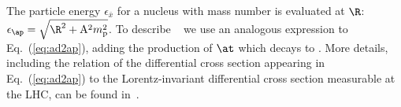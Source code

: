 % 
% 
The particle energy $\epsilon_{\bar x}$ for a nucleus with mass number \Anucl is evaluated at $\R$: $\epsilon_{\ap}=\sqrt{\R^{2}+\mathrm{A}^2m_{\mathrm{p}}^{2}}$. 
%
To describe \antihethree~ we use an analogous expression to Eq.~(\ref{eq:ad2ap}), adding the production of $\at$ which decays to \antihethree. More details, including the relation of the differential cross section appearing in Eq.~(\ref{eq:ad2ap}) to the Lorentz-invariant differential cross section measurable at the LHC, can be found in~\cite{Blum:2017qnn}.
%

%

